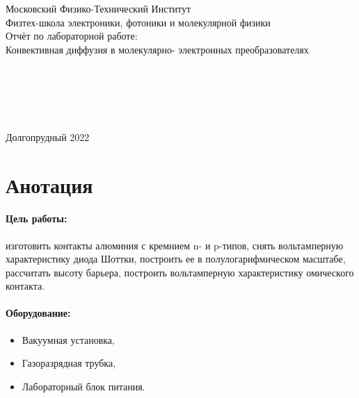 \documentclass[a4paper,12pt]{article} %
\begin{document}



\begin{center}
{\LARGE Московский Физико-Технический Институт}
\\
{\large Физтех-школа электроники, фотоники и молекулярной физики }
\\
\vspace{8cm}
{\LARGE Отчёт по лабораторной работе:}
\\
{\Huge Конвективная диффузия в молекулярно- электронных преобразователях} 
\\
\vspace{5cm}
\raggedright 
\hspace{7cm}{\large Выполнили студенты группы Б04-005}\\
\hspace{7cm}{\large Карташов Констанин}\\
\hspace{7cm}{\large Давыдов Владислав}\\
\hspace{7cm}{\large Корнеев Николай}\\
\hspace{7cm}{\large Голощапов Михаил}

\vspace{\fill}
\center
{\large Долгопрудный 2022}

\end{center}

\newpage


\section{Анотация}

\paragraph{Цель работы:} 
изготовить контакты алюминия с кремнием n- и p-типов, снять вольтамперную характеристику диода Шоттки, построить ее в полулогарифмическом масштабе, рассчитать высоту барьера, построить вольтамперную характеристику омического контакта.
\paragraph{Оборудование:}
\begin{itemize}
\renewcommand{\labelitemi}{$\triangleright$}
\itemsep0em
\item Вакуумная установка,
\item Газоразрядная трубка,
\item Лабораторный блок питания.
\end{itemize}
\end{document}
